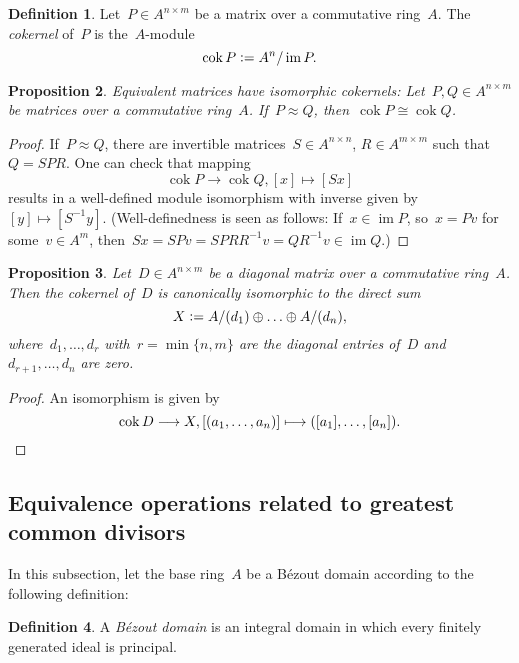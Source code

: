 \documentclass[12pt]{scrartcl}
\theoremstyle{definition}
\newtheorem{definition}{Definition}[section]
\theoremstyle{plain}
\newtheorem{proposition}[definition]{Proposition}
\theoremstyle{remark}
\DeclareMathOperator{\cok}{cok}
\DeclareMathOperator{\image}{im}
\newcommand{\defeq}{\vcentcolon=}
\begin{document}
\begin{definition}
    Let~$P \in A^{n \times m}$ be a matrix over a commutative ring~$A$. The \emph{cokernel} of~$P$ is the~$A$-module
    \[ \cok{P} \defeq A^n/\image{P}. \]
\end{definition}

\begin{proposition}\label{prop:eqv-cok}
    Equivalent matrices have isomorphic cokernels:
    Let~$P,Q \in A^{n \times m}$ be matrices over
    a commutative ring~$A$. If~$P \approx Q$,
    then~$\cok{P} \cong \cok{Q}$.
\end{proposition}

\begin{proof}
    If~$P \approx Q$, there are invertible matrices~$S \in A^{n \times n}$, $R \in A^{m \times m}$ such that~$Q = SPR$. One can check that mapping
    \[ \cok{P} \longrightarrow \cok{Q},
    [x] \longmapsto [Sx] \]
    results in a well-defined module isomorphism with inverse given by~$[y] \mapsto [S^{-1}y]$. (Well-definedness is seen as follows: If~$x \in \image{P}$, so~$x = Pv$ for some~$v \in A^m$, then~$Sx = SPv = SPRR^{-1}v = QR^{-1}v \in \image{Q}$.)
\end{proof}

\begin{proposition}\label{prop:diag-cok}
    Let~$D \in A^{n \times m}$ be a diagonal matrix over a commutative ring~$A$. Then the cokernel of~$D$ is canonically isomorphic to the direct sum
    \[ X \defeq A/(d_1) \oplus \ldots \oplus A/(d_n), \]
    where~$d_1,\ldots,d_r$ with~$r = \min\{n,m\}$ are the diagonal entries of~$D$ and~$d_{r+1},\ldots,d_n$ are zero.
\end{proposition}

\begin{proof}
    An isomorphism is given by
    \[ \cok{D} \longrightarrow X, [(a_1,\ldots,a_n)] \longmapsto ([a_1],\ldots,[a_n]). \qedhere \]
\end{proof}


\subsection{Equivalence operations related to greatest common divisors}

In this subsection, let the base ring~$A$ be a Bézout domain according to the following definition:

\begin{definition}
    A \emph{Bézout domain} is an integral domain in which every finitely generated ideal is principal.
\end{definition}
\end{document}
